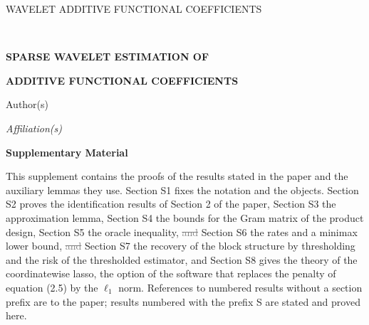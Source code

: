 \documentclass[10pt]{book}
\theoremstyle{definition}
\begin{document}
\renewcommand{\baselinestretch}{2}


{\hfill {\footnotesize\rm WAVELET ADDITIVE FUNCTIONAL COEFFICIENTS} \hfill}

\renewcommand{\thefootnote}{}
$\ $\par \fontsize{12}{14pt plus.8pt minus .6pt}\selectfont


\centerline{\large\bf SPARSE WAVELET ESTIMATION OF}
\vspace{2pt}
\centerline{\large\bf ADDITIVE FUNCTIONAL COEFFICIENTS}
\vspace{.25cm}
\centerline{Author(s)}
\vspace{.4cm}
\centerline{\it Affiliation(s)}
\vspace{.55cm}
\centerline{\bf Supplementary Material}
\vspace{.55cm}
\fontsize{9}{11.5pt plus.8pt minus .6pt}\selectfont
\noindent
This supplement contains the proofs of the results stated in the paper and
the auxiliary lemmas they use. Section S1 fixes the notation and the objects.
Section S2 proves the identification results of Section 2 of the paper,
Section S3 the approximation lemma, Section S4 the bounds for the Gram matrix
of the product design, Section S5 the oracle inequality, \textcolor{gray}{\sout{and}} Section S6 the
rates \textcolor{colR1}{and a minimax lower bound}\textcolor{colR1}{, \textcolor{gray}{\sout{and}} Section S7 the recovery of the block structure by
thresholding} \textcolor{colR1}{and the risk of the thresholded estimator, and
Section S8 gives the theory of the coordinatewise lasso, the option of the
software that replaces the penalty of equation (2.5) by the $\ell_1$ norm}. References to numbered results without a section prefix are to the
paper; results numbered with the prefix S are stated and proved here.
\par

\setcounter{section}{0}
\setcounter{equation}{0}
\def\theequation{S\arabic{section}.\arabic{equation}}
\def\thesection{S\arabic{section}}

\fontsize{12}{14pt plus.8pt minus .6pt}\selectfont
\end{document}
